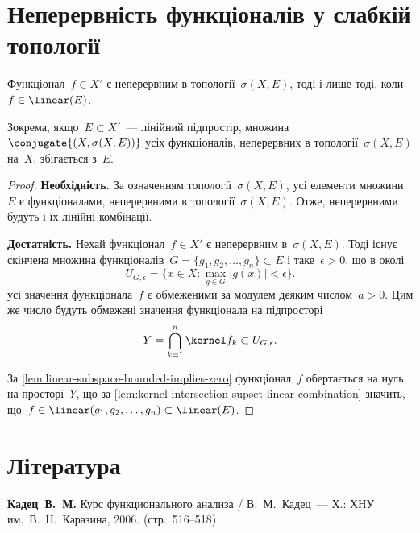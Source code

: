 \section{Неперервність функціоналів у слабкій топології}

\begin{theorem}
    Функціонал~$f \in X'$ є неперервним в топології~$\sigma(X, E)$, тоді і лише тоді, коли~$f \in \linear(E)$.
\end{theorem}

\begin{remark}
    Зокрема, якщо~$E \subset X'$~--- лінійний підпростір, множина~$\conjugate{(X, \sigma(X, E))}$ усіх функціоналів, неперервних в топології~$\sigma(X, E)$ на~$X$, збігається з~$E$.
\end{remark}

\begin{proof}
    \textbf{Необхідність.} За означенням топології~$\sigma(X, E)$, усі елементи множини~$E$ є функціоналами, неперервними в топології~$\sigma(X, E)$. Отже, неперервними будуть і їх лінійні комбінації.

    \textbf{Достатність.} Нехай функціонал~$f \in X'$ є неперервним в~$\sigma(X, E)$. Тоді існує скінчена множина функціоналів~$G = \{g_1, g_2, \dots, g_n\} \subset E$ і таке~$\epsilon > 0$, що в околі
    \begin{equation*}
        U_{G, \epsilon} = \{x \in X: \max_{g \in G} |g(x)| < \epsilon\}.
    \end{equation*}
    усі значення функціонала~$f$ є обмеженими за модулем деяким числом~$a > 0$. Цим же число будуть обмежені значення функціонала на підпросторі
    \begin{equation*}
        Y = \bigcap_{k = 1}^n \kernel f_k \subset U_{G, \epsilon}.
    \end{equation*}

    За \cref{lem:linear-subspace-bounded-implies-zero} функціонал~$f$ обертається на нуль на просторі~$Y$, що за \cref{lem:kernel-intersection-supset-linear-combination} значить, що~$f \in \linear(g_1, g_2, \dots, g_n) \subset \linear(E)$.
\end{proof}

\section{Література}

\begin{enumerate}[label={[\arabic*]}]
\item \textbf{Кадец~В.~М.}
Курс функционального анализа /
В.~М.~Кадец~---
Х.: ХНУ им.~В.~Н.~Каразина, 2006. (стр.~516--518).
\end{enumerate}
